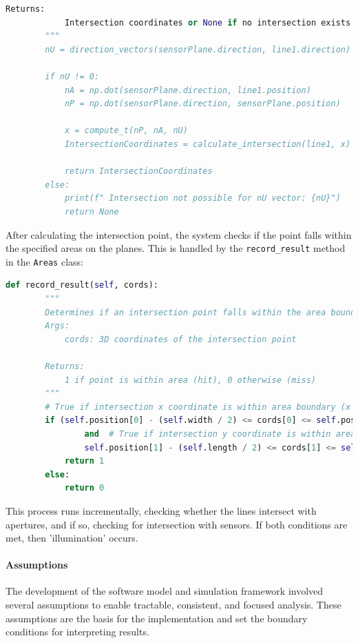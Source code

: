 \begin{lstlisting}[style=pythonstyle, caption=Ray-Plane Intersection Algorithm, label=lst:Ray-Plane Intersection Algorithm, language=Python ]
        Returns:
            Intersection coordinates or None if no intersection exists
        """
        nU = direction_vectors(sensorPlane.direction, line1.direction)

        if nU != 0:
            nA = np.dot(sensorPlane.direction, line1.position)
            nP = np.dot(sensorPlane.direction, sensorPlane.position)

            x = compute_t(nP, nA, nU)
            IntersectionCoordinates = calculate_intersection(line1, x)

            return IntersectionCoordinates
        else:
            print(f" Intersection not possible for nU vector: {nU}")
            return None
\end{lstlisting}

After calculating the intersection point, the system checks if the point falls within the specified areas on the planes. This is handled by the \verb|record_result| method in the \verb|Areas| class:

\begin{lstlisting}[style=pythonstyle, caption=Area Intersection Testing, label=lst:Area_Intersection_Testing, language=Python ]
    def record_result(self, cords):
        """
        Determines if an intersection point falls within the area boundaries.
        Args:
            cords: 3D coordinates of the intersection point
            
        Returns:
            1 if point is within area (hit), 0 otherwise (miss)
        """
        # True if intersection x coordinate is within area boundary (x min and x max)
        if (self.position[0] - (self.width / 2) <= cords[0] <= self.position[0] + (self.width / 2)
                and  # True if intersection y coordinate is within area boundary (y min and y max)
                self.position[1] - (self.length / 2) <= cords[1] <= self.position[1] + (self.length / 2)):
            return 1
        else:
            return 0
    \end{lstlisting}

This process runs incrementally, checking whether the lines intersect with apertures, and if so, checking for intersection with sensors. If both conditions are met, then 'illumination' occurs. 

\paragraph{Assumptions}
The development of the software model and simulation framework involved several assumptions to enable tractable, consistent, and focused analysis. These assumptions are the basis for the implementation and set the boundary conditions for interpreting results.

